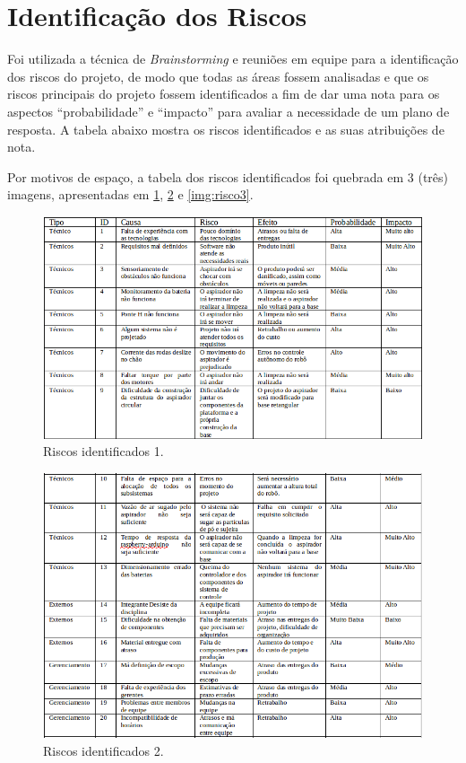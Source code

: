 \section{Identificação dos Riscos} %
\label{sec:identificação_dos_riscos}
	
	Foi utilizada a técnica de \textit{Brainstorming} e reuniões em equipe para a identificação dos riscos do projeto, de modo que todas as áreas fossem analisadas e que os riscos principais do projeto fossem identificados a fim de dar uma nota para os aspectos “probabilidade” e “impacto” para avaliar a necessidade de um plano de resposta. A tabela abaixo mostra os riscos identificados e as suas atribuições de nota.

	Por motivos de espaço, a tabela dos riscos identificados foi quebrada em 3 (três) imagens, apresentadas em \ref{img:risco1}, \ref{img:risco2} e \ref{img:risco3}.

	\begin{figure}[H]
		\centering
		\includegraphics[scale=0.6]{figuras/riscos1.png}
		\caption{Riscos identificados 1.}
		\label{img:risco1}
	\end{figure}

	\begin{figure}[H]
		\centering
		\includegraphics[scale=0.6]{figuras/riscos2.png}
		\caption{Riscos identificados 2.}
		\label{img:risco2}
	\end{figure}

